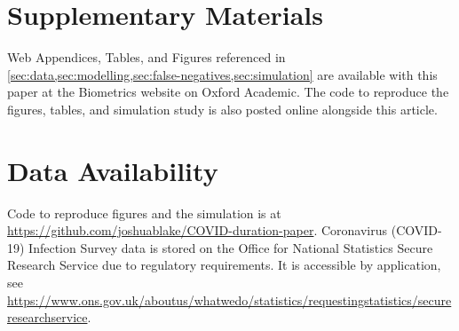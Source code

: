 \documentclass[referee,useAMS,usenatbib]{biom}
\begin{document}
\section*{Supplementary Materials}

Web Appendices, Tables, and Figures referenced in \cref{sec:data,sec:modelling,sec:false-negatives,sec:simulation} are available with this paper at the Biometrics website on Oxford Academic.
The code to reproduce the figures, tables, and simulation study is also posted online alongside this article.

\section*{Data Availability}

Code to reproduce figures and the simulation is at \url{https://github.com/joshuablake/COVID-duration-paper}.
Coronavirus (COVID-19) Infection Survey data is stored on the Office for National Statistics Secure Research Service due to regulatory requirements.
It is accessible by application, see \url{https://www.ons.gov.uk/aboutus/whatwedo/statistics/requestingstatistics/secureresearchservice}.


 

\label{lastpage}
\end{document}

